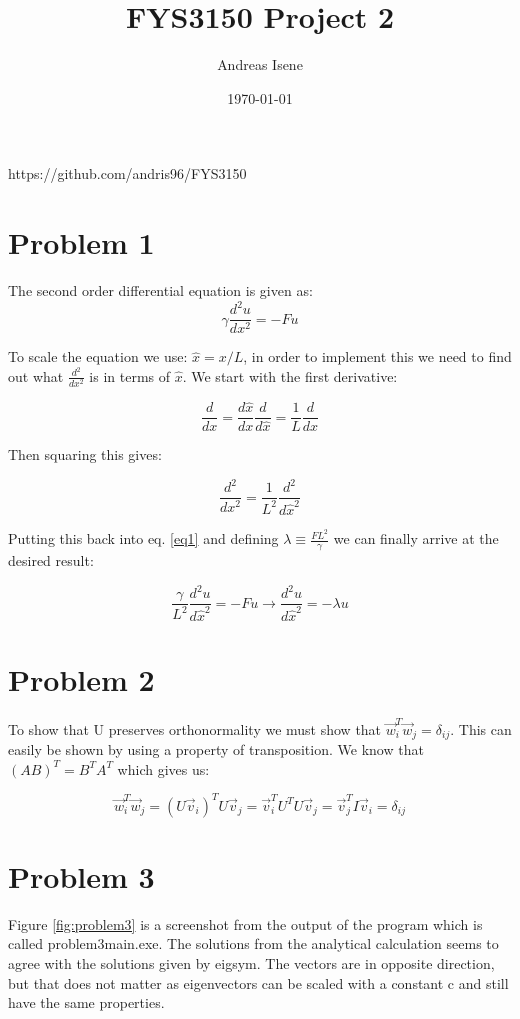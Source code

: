 \documentclass[english,notitlepage]{revtex4-1}
\begin{document}
	
	\title{FYS3150 Project 2}      
	\author{Andreas Isene}         
	\date{\today}                             
	\noaffiliation                          
	
	
	\maketitle 
	
	https://github.com/andris96/FYS3150
	
	\section*{Problem 1}
	The second order differential equation is given as:
		$$\gamma \frac{d^2u}{dx^2} = -Fu$$

	
	To scale the equation we use: $\hat{x} = x/L$, in order to implement this we need to find out what $\frac{d^2}{dx^2}$ is in terms of $\hat{x}$. We start with the first derivative:
	
	$$\frac{d}{dx} = \frac{d\hat{x}}{dx}\frac{d}{d\hat{x}} = \frac{1}{L}\frac{d}{d\hat{x}}$$
	
	Then squaring this gives:
	
	$$\frac{d^2}{dx^2} = \frac{1}{L^2}\frac{d^2}{d\hat{x}^2}$$
	
	Putting this back into eq. \ref{eq1} and defining $\lambda \equiv \frac{FL^2}{\gamma}$ we can finally arrive at the desired result:
	
	$$ \frac{\gamma}{L^2} \frac{d^2u}{d\hat{x}^2} = -Fu \rightarrow \frac{d^2u}{d\hat{x}^2} = -\lambda u$$
	
	
	\section*{Problem 2}
	To show that U preserves orthonormality we must show that $ \vec{w}_i^T\vec{w}_j = \delta_{ij}$. This can easily be shown by using a property of transposition. We know that $(AB)^T = B^T A^T$ which gives us: 

	$$ \vec{w}_i^T\vec{w}_j = (U\vec{v}_i)^T U\vec{v}_j = \vec{v}_i^T U^T U \vec{v}_j = \vec{v}_j^TI\vec{v}_i = \delta_{ij}$$ 

	
	\section*{Problem 3}
	
	Figure \ref{fig:problem3} is a screenshot from the output of the program which is called problem3\textunderscore main.exe. The solutions from the analytical calculation seems to agree with the solutions given by eig\textunderscore sym. The vectors are in opposite direction, but that does not matter as eigenvectors can be scaled with a constant c and still have the same properties.
	
\end{document}
